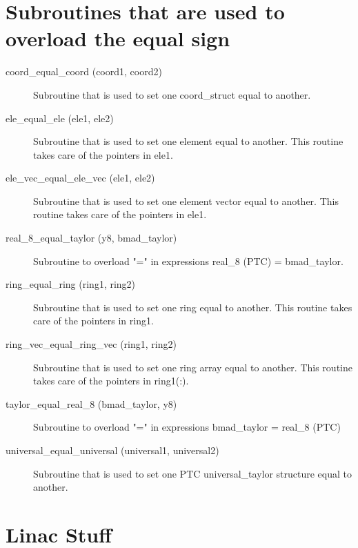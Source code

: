 \section{Subroutines that are used to overload the equal sign}
\label{r:equal}    

\begin{description}

\item[coord\_equal\_coord (coord1, coord2)] \Newline
Subroutine that is used to set one coord\_struct equal to another. 

\item[ele\_equal\_ele (ele1, ele2)] \Newline
Subroutine that is used to set one element equal to another. 
This routine takes care of the pointers in ele1. 

\item[ele\_vec\_equal\_ele\_vec (ele1, ele2)] \Newline
Subroutine that is used to set one element vector equal to another. 
This routine takes care of the pointers in ele1. 

\item[real\_8\_equal\_taylor (y8, bmad\_taylor)] \Newline
Subroutine to overload "=" in expressions real\_8 (PTC) = bmad\_taylor.

\item[ring\_equal\_ring (ring1, ring2)] \Newline
Subroutine that is used to set one ring equal to another. 
This routine takes care of the pointers in ring1. 

\item[ring\_vec\_equal\_ring\_vec (ring1, ring2)] \Newline
Subroutine that is used to set one ring array equal to another. 
This routine takes care of the pointers in ring1(:). 

\item[taylor\_equal\_real\_8 (bmad\_taylor, y8)] \Newline
Subroutine to overload "=" in expressions bmad\_taylor = real\_8 (PTC) 

\item[universal\_equal\_universal (universal1, universal2)] \Newline
Subroutine that is used to set one PTC universal\_taylor 
structure equal to another. 

\end{description}

\section{Linac Stuff}
\label{r:linac}    

